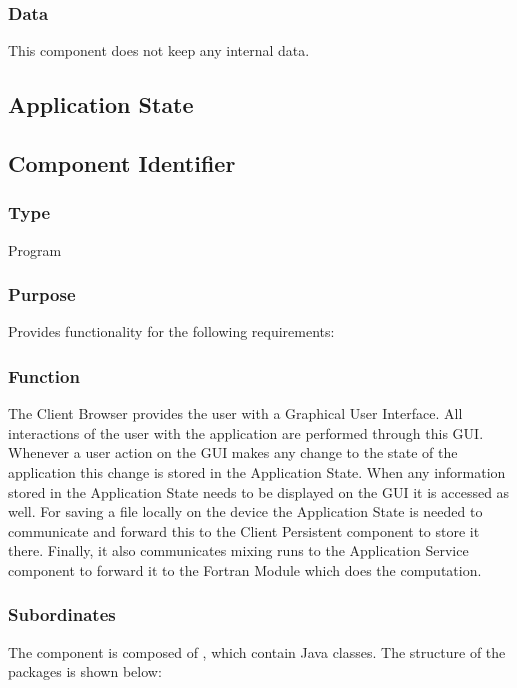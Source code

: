 \subsubsection*{Data}
This component does not keep any internal data.

\subsection{Application State}
\label{subsec:appstate}

\subsection*{Component Identifier}
\RTMCAS{}

\subsubsection*{Type}
Program

\subsubsection*{Purpose}
Provides functionality for the following requirements:

\noindent {}

\subsubsection*{Function}
The Client Browser provides the user with a Graphical User Interface. All interactions of the user with the application are performed through this GUI. Whenever a user action on the GUI makes any change to the state of the application this change is stored in the Application State. When any information stored in the Application State needs to be displayed on the GUI it is accessed as well. For saving a file locally on the device the Application State is needed to communicate and forward this to the Client Persistent component to store it there. Finally, it also communicates mixing runs to the Application Service component to forward it to the Fortran Module which does the computation.

\subsubsection*{Subordinates}
The component is composed of , which contain Java classes. The structure of the packages is shown below:

